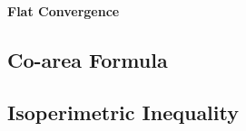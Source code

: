 \paragraph{Flat Convergence}\label{sec:flat_convergence}\hfill



\subsection{Co-area Formula}\label{sec:coarea_formula}

\subsection{Isoperimetric Inequality}\label{sec:isoperimetric_inequality}
